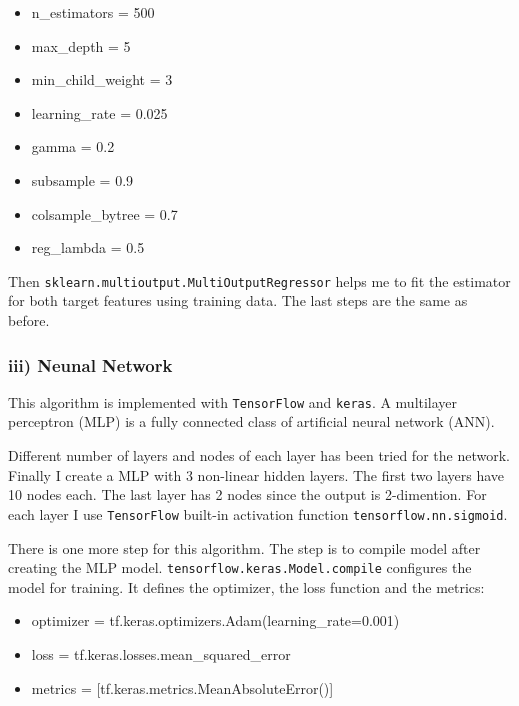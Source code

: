 \documentclass[a4paper,12pt]{article}
\begin{document}
\begin{itemize}

    \item n\_estimators = 500
    \item max\_depth = 5
    \item min\_child\_weight = 3
    \item learning\_rate = 0.025
    \item gamma = 0.2
    \item subsample = 0.9
    \item colsample\_bytree = 0.7
    \item reg\_lambda = 0.5

\end{itemize}

Then \texttt{sklearn.multioutput.MultiOutputRegressor} helps me to fit the estimator for both target features using training 
data. The last steps are the same as before.

\subsubsection*{iii) Neunal Network}

This algorithm is implemented with \texttt{TensorFlow} and \texttt{keras}. A multilayer perceptron (MLP) is a fully connected 
class of artificial neural network (ANN). 

Different number of layers and nodes of each layer has been tried for the network. Finally I create a MLP with 3 non-linear 
hidden layers. The first two layers have 10 nodes each. The last layer has 2 nodes since the output is 2-dimention. For each 
layer I use \texttt{TensorFlow} built-in activation function \texttt{tensorflow.nn.sigmoid}.

There is one more step for this algorithm. The step is to compile model after creating the MLP model. 
\texttt{tensorflow.keras.Model.compile} configures the model for training. It defines the optimizer, the loss function and the 
metrics:

\begin{itemize}

    \item optimizer = tf.keras.optimizers.Adam(learning\_rate=0.001)
    \item loss = tf.keras.losses.mean\_squared\_error
    \item metrics = [tf.keras.metrics.MeanAbsoluteError()]

\end{itemize}
\end{document}
